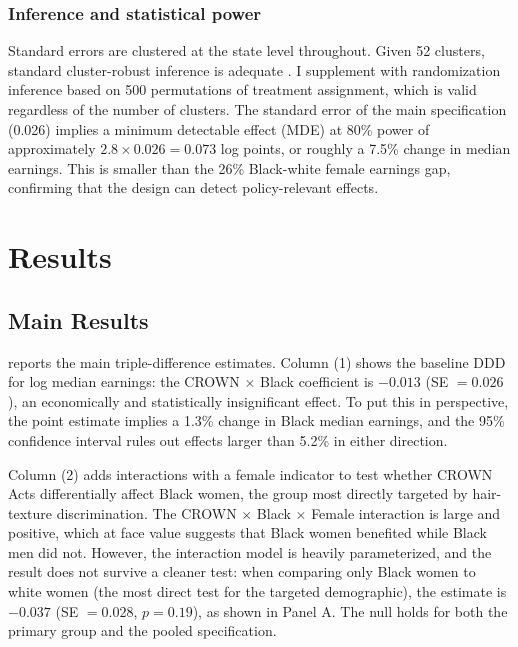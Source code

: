 \documentclass[12pt]{article}
\begin{document}
\subsubsection*{Inference and statistical power} Standard errors are clustered at the state level throughout. Given 52 clusters, standard cluster-robust inference is adequate \citep{cameron_miller_2015}. I supplement with randomization inference based on 500 permutations of treatment assignment, which is valid regardless of the number of clusters. The standard error of the main specification (0.026) implies a minimum detectable effect (MDE) at 80\% power of approximately $2.8 \times 0.026 = 0.073$ log points, or roughly a 7.5\% change in median earnings. This is smaller than the 26\% Black-white female earnings gap, confirming that the design can detect policy-relevant effects.


\section{Results}
\label{sec:results}

\subsection{Main Results}



 reports the main triple-difference estimates. Column (1) shows the baseline DDD for log median earnings: the CROWN $\times$ Black coefficient is $-0.013$ (SE $= 0.026$), an economically and statistically insignificant effect. To put this in perspective, the point estimate implies a 1.3\% change in Black median earnings, and the 95\% confidence interval rules out effects larger than 5.2\% in either direction.

Column (2) adds interactions with a female indicator to test whether CROWN Acts differentially affect Black women, the group most directly targeted by hair-texture discrimination. The CROWN $\times$ Black $\times$ Female interaction is large and positive, which at face value suggests that Black women benefited while Black men did not. However, the interaction model is heavily parameterized, and the result does not survive a cleaner test: when comparing only Black women to white women (the most direct test for the targeted demographic), the estimate is $-0.037$ (SE $= 0.028$, $p = 0.19$), as shown in  Panel A. The null holds for both the primary group and the pooled specification.
\end{document}
